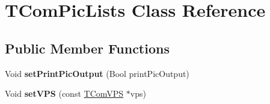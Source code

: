 \hypertarget{class_t_com_pic_lists}{}\section{T\+Com\+Pic\+Lists Class Reference}
\label{class_t_com_pic_lists}
\subsection*{Public Member Functions}
\begin{DoxyCompactItemize}
\item 
\mbox{\label{class_t_com_pic_lists_a73badb3c88d12c23cc264d5bd803904a}} 
Void {\bfseries set\+Print\+Pic\+Output} (Bool print\+Pic\+Output)
\item 
\mbox{\label{class_t_com_pic_lists_acea763862c0ef96ad3b5f82d5ef026f6}} 
Void {\bfseries set\+V\+PS} (const \hyperlink{class_t_com_v_p_s}{T\+Com\+V\+PS} $\ast$vps)
\end{DoxyCompactItemize}
{\bf }\par
